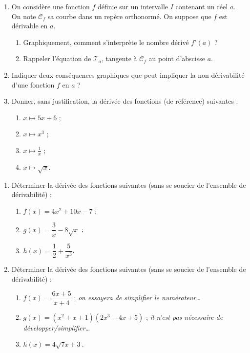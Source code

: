 \documentclass[a4paper,11pt]{article}
\begin{document}

\begin{enumerate}
	\item On considère une fonction $f$ définie sur un intervalle $I$ contenant un réel $a$. On note $\mathscr{C}_f$ sa courbe dans un repère orthonormé. On suppose que $f$ est dérivable en $a$.
	\begin{enumerate}
		\item Graphiquement, comment s'interprète le nombre dérivé $f'(a)$ ?
		\item Rappeler l'équation de $\mathscr{T}_a$, tangente à $\mathscr{C}_f$ au point d'abscisse $a$.
	\end{enumerate}
	\item Indiquer deux conséquences graphiques que peut impliquer la non dérivabilité d'une fonction $f$ en $a$ ?
	\item Donner, sans justification, la dérivée des fonctions (de référence) suivantes :
	
	\vspace{-1.25\parskip}
	
	\parbox{\linewidth}{%
		\begin{multicols}{4}
			\begin{enumerate}
				\item $x \mapsto 5x+6$ ;
				\item $x \mapsto x^3$ ;
				\item $x \mapsto \tfrac{1}{x}$ ;
				\item $x \mapsto \sqrt{x}$.
			\end{enumerate}
		\end{multicols}}
	\vspace*{-1.1\parskip}
\end{enumerate}

\smallskip


\begin{enumerate}
	\item Déterminer la dérivée des fonctions suivantes (sans se soucier de l'ensemble de dérivabilité) :
	\begin{enumerate}
		\item $f(x)=4x^2+10x-7$ ;
		\item $g(x)=\dfrac{3}{x}-8\sqrt{x}$ ;
		\item $h(x)=\dfrac{1}{2}+\dfrac{5}{x^3}$.
	\end{enumerate}
	\item Déterminer la dérivée des fonctions suivantes (sans se soucier de l'ensemble de dérivabilité) :
	\begin{enumerate}
		\item $f(x)=\dfrac{6x+5}{x+4}$ ; \tabto{6.5cm}\textit{\footnotesize \faHandPointRight[regular] \small on essayera de simplifier le numérateur\ldots}
		\item $g(x)=(x^2+x+1)(2x^3-4x+5)$ ; \tabto{6.5cm}\textit{\footnotesize \faHandPointRight[regular] \small il n'est pas nécessaire de développer/simplifier\ldots}
		\item $h(x)=4\sqrt{7x+3}$.
	\end{enumerate}
\end{enumerate}
\end{document}
